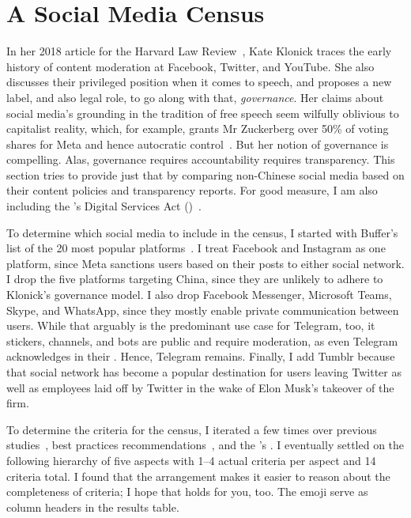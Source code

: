 
\section{A Social Media Census}
\label{sec:census}

In her 2018 article for the Harvard Law Review~\cite{Klonick2018}, Kate Klonick
traces the early history of content moderation at Facebook, Twitter, and
YouTube. She also discusses their privileged position when it comes to speech,
and proposes a new label, and also legal role, to go along with that,
\emph{governance}. Her claims about social media's grounding in the tradition of
free speech seem wilfully oblivious to capitalist reality, which, for example,
grants Mr Zuckerberg over 50\% of voting shares for Meta and hence autocratic
control~\cite{LauricellaNorton2021}. But her notion of governance is compelling.
Alas, governance requires accountability requires transparency. This section
tries to provide just that by comparing non-Chinese social media based on their
content policies and transparency reports. For good measure, I am also including
the \EU's Digital Services Act (\DSA)~\cite{EuropeanParliamentAndCouncil2022}.

To determine which social media to include in the census, I started with
Buffer's list of the 20 most popular platforms~\cite{Lua2022}. I treat Facebook
and Instagram as one platform, since Meta sanctions users based on their posts
to either social network. I drop the five platforms targeting China, since they
are unlikely to adhere to Klonick's governance model. I also drop Facebook
Messenger, Microsoft Teams, Skype, and WhatsApp, since they mostly enable
private communication between users. While that arguably is the predominant use
case for Telegram, too, it stickers, channels, and bots are public and require
moderation, as even Telegram acknowledges in their \FAQ. Hence, Telegram
remains. Finally, I add Tumblr because that social network has become a popular
destination for users leaving Twitter as well as employees laid off by Twitter
in the wake of Elon Musk's takeover of the firm.

To determine the criteria for the census, I iterated a few times over previous
studies~\cite{BradfordGriselea2019,CrockerGebhartea2019}, best practices
recommendations~\cite{AccessNowACLUFoundationOfNorthernCaliforniaea2021}, and
the \EU's \DSA. I eventually settled on the following hierarchy of five aspects
with 1--4 actual criteria per aspect and 14 criteria total. I found that the
arrangement makes it easier to reason about the completeness of criteria; I hope
that holds for you, too. The emoji serve as column headers in the results table.

